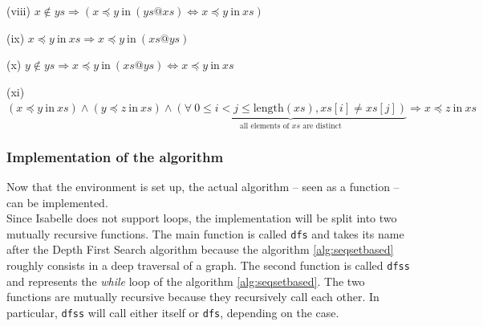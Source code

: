 \documentclass[a4 paper, 12pt]{article}
\theoremstyle{definition}
\begin{document}
\begin{flushleft}
    (viii)
    $x \notin ys \Longrightarrow (x \preceq y~\text{in}~(ys @ xs) \Longleftrightarrow x \preceq y~\text{in}~xs)$
\end{flushleft}

\begin{flushleft}
    (ix)
    $x \preceq y~\text{in}~xs \Longrightarrow x \preceq y~\text{in}~(xs @ ys)$
\end{flushleft}

\begin{flushleft}
    (x)
    $y \notin ys \Longrightarrow x \preceq y~\text{in}~(xs @ ys) \Longleftrightarrow x \preceq y~\text{in}~xs$
\end{flushleft}

\begin{flushleft}
    (xi)
    $(x \preceq y~\text{in}~xs) \wedge (y \preceq z~\text{in}~xs) \wedge \underset{\text{all elements of $xs$ are distinct}}{\underbrace{(\forall~0 \leq i < j \leq \text{length}(xs), xs[i] \neq xs[j])}} \Longrightarrow x \preceq z~\text{in}~xs$
\end{flushleft}



\subsubsection{Implementation of the algorithm}

Now that the environment is set up, the actual algorithm -- seen as a function -- can be implemented.\\
Since Isabelle does not support loops, the implementation will be split into two mutually recursive functions. The main function is called \texttt{dfs} and takes its name after the Depth First Search algorithm because the algorithm \ref{alg:seqsetbased} roughly consists in a deep traversal of a graph. The second function is called \texttt{dfss} and represents the \textit{while} loop of the algorithm \ref{alg:seqsetbased}. The two functions are mutually recursive because they recursively call each other. In particular, \texttt{dfss} will call either itself or \texttt{dfs}, depending on the case.
\end{document}
